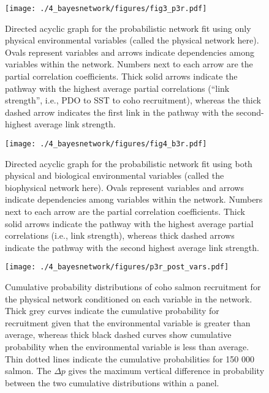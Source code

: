 \begin{figure}[htbp]
  \centering \texttt{[image: ./4\_bayesnetwork/figures/fig3\_p3r.pdf]}
  \caption{Directed acyclic graph for the probabilistic network fit using only
    physical environmental variables (called the physical network here). Ovals
    represent variables and arrows indicate dependencies among variables within
    the network. Numbers next to each arrow are the partial correlation
    coefficients. Thick solid arrows indicate the pathway with the highest
    average partial correlations (``link strength'', i.e., PDO to SST to coho
    recruitment), whereas the thick dashed arrow indicates the first link in the
    pathway with the second-highest average link strength.}
  \label{fig:bn:4}
\end{figure}

\begin{figure}[htbp]
  \centering \texttt{[image: ./4\_bayesnetwork/figures/fig4\_b3r.pdf]}
  \caption{Directed acyclic graph for the probabilistic network fit using both
    physical and biological environmental variables (called the biophysical
    network here). Ovals represent variables and arrows indicate dependencies
    among variables within the network. Numbers next to each arrow are the
    partial correlation coefficients. Thick solid arrows indicate the pathway
    with the highest average partial correlations (i.e., link strength), whereas
    thick dashed arrows indicate the pathway with the second highest average
    link strength.}
  \label{fig:bn:5}
\end{figure}

\begin{figure}[htbp]
  \centering \texttt{[image: ./4\_bayesnetwork/figures/p3r\_post\_vars.pdf]}
  \caption{Cumulative probability distributions of coho salmon recruitment for
    the physical network conditioned on each variable in the network. Thick grey
    curves indicate the cumulative probability for recruitment given that the
    environmental variable is greater than average, whereas thick black dashed
    curves show cumulative probability when the environmental variable is less
    than average. Thin dotted lines indicate the cumulative probabilities for
    150 000 salmon. The \(\Delta p\) gives the maximum vertical difference in
    probability between the two cumulative distributions within a panel.}
  \label{fig:bn:6}
\end{figure}

